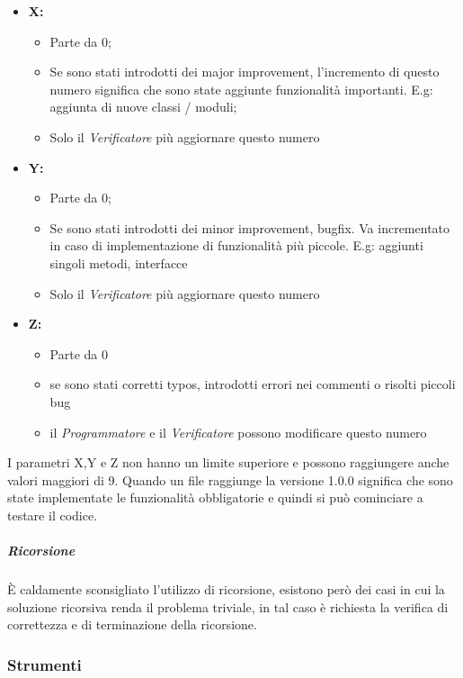 			\begin{itemize}
				\item \textbf{X:} 
					\begin{itemize}
						\item Parte da 0;
						\item Se sono stati introdotti dei major improvement, l'incremento di questo numero significa che sono state aggiunte funzionalità importanti. E.g: aggiunta di nuove classi / moduli;
						\item Solo il \emph{Verificatore} più aggiornare questo numero
					\end{itemize}
				
				\item \textbf{Y:} 
					\begin{itemize}
						\item Parte da 0;
						\item Se sono stati introdotti dei minor improvement, bugfix. Va incrementato in caso di implementazione di funzionalità più piccole. E.g: aggiunti singoli metodi, interfacce
						\item Solo il \emph{Verificatore} più aggiornare questo numero
					\end{itemize}

				\item \textbf{Z:}
					\begin{itemize}
						\item Parte da 0
						\item se sono stati corretti typos, introdotti errori nei commenti o risolti piccoli bug
						\item il \emph{Programmatore} e il \emph{Verificatore} possono modificare questo numero
					\end{itemize}
			\end{itemize}
			I parametri X,Y e Z non hanno un limite superiore e possono raggiungere anche valori maggiori di 9.
			Quando un file raggiunge la versione 1.0.0 significa che sono state implementate le funzionalità obbligatorie e quindi si può cominciare a testare il codice.
			\subparagraph{Ricorsione} \Spazio
			È caldamente sconsigliato l'utilizzo di ricorsione, esistono però dei casi in cui la soluzione ricorsiva renda il problema triviale, in tal caso è richiesta la verifica di correttezza e di terminazione della ricorsione.
			
	\subsubsection{Strumenti}
